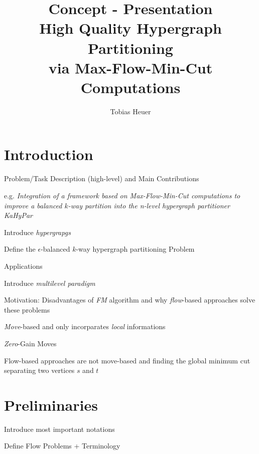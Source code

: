 \documentclass[11pt]{llncs}
\title{Concept - Presentation \\ High Quality Hypergraph Partitioning \\ via Max-Flow-Min-Cut Computations}
\author{
    Tobias Heuer
}
\institute{%
Karlsruhe Institute of Technology (KIT), Karlsruhe, Germany.
}
\newcommand{\cmark}{\ding{51}}%
\newcommand{\done}{\rlap{$\square$}{\raisebox{2pt}{\large\hspace{1pt}\cmark}}%
\hspace{-2.5pt}}
\begin{document}
\maketitle

\section{Introduction}

\begin{todolist}
\item[\done] Problem/Task Description (high-level) and Main Contributions
    \begin{todolist}
    \item[\done] e.g. \emph{Integration of a framework based on Max-Flow-Min-Cut
          computations to improve a balanced $k$-way partition into the n-level
          hypergraph partitioner KaHyPar}
    \end{todolist}
\item[\done] Introduce \emph{hypergrapgs}
\item[\done] Define the $\epsilon$-balanced $k$-way hypergraph partitioning Problem
\item[\done] Applications
\item[\done] Introduce \emph{multilevel paradigm} 
\item Motivation: Disadvantages of \emph{FM} algorithm and why \emph{flow}-based
      approaches solve these problems
    \begin{todolist}
    \item[\done] \emph{Move}-based and only incorparates \emph{local} informations
    \item[\done] \emph{Zero}-Gain Moves
    \item Flow-based approaches are not move-based and finding the global minimum cut 
          separating two vertices $s$ and $t$
    \end{todolist}
\end{todolist}

\section{Preliminaries}

\begin{todolist}
\item Introduce most important notations
\item[\done] Define Flow Problems + Terminology
\end{todolist}
\end{document}
